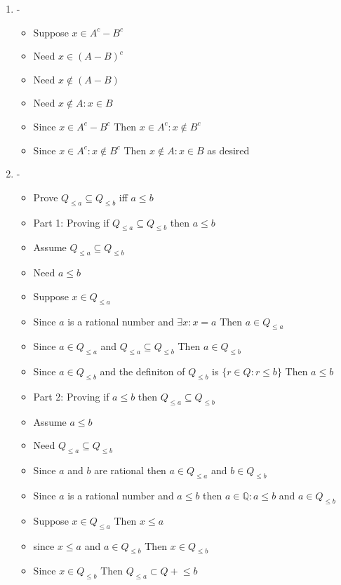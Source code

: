 \documentclass{article}
\begin{document}
\begin{enumerate}
    \item -
    \begin{itemize}
        \item Suppose $x \in A^c - B^c $
        \item Need $x \in (A-B)^c $ 
        \item Need $x \notin (A-B) $
        \item Need $x \notin A: x \in B$ 
        \item Since $x \in A^c - B^c $ Then $x \in A^c : x \notin B^c$
        \item Since $x \in A^c : x \notin B^c$ Then $x \notin A : x \in B$ as desired 
    \end{itemize}
    \item - 
    \begin{itemize}
        \item Prove $Q_{\leq a} \subseteq Q_{\leq b}$ iff $a \leq b $ 
        \item Part 1: Proving if $Q_{\leq a} \subseteq Q_{\leq b}$ then $a \leq b $ 
        \item Assume $Q_{\leq a} \subseteq Q_{\leq b}$
        \item Need $a \leq b $ 
        \item Suppose $ x \in Q_{\leq a}$ 
        \item Since $a$ is a rational number and $\exists x : x = a $ Then $ a \in Q_{\leq a} $ 
        \item Since $ a \in Q_{\leq a} $ and  $ Q_{\leq a} \subseteq Q_{\leq b}$ Then $a \in Q_{\leq b}$
        \item Since $a \in Q_{\leq b} $ and the definiton of $Q_{\leq b} $ is $\{ r \in Q: r \leq b \} $ Then $a \leq b $
        \item Part 2: Proving if $a \leq b $ then $Q_{\leq a} \subseteq Q_{\leq b}$
        \item Assume $a \leq b $
        \item Need $Q_{\leq a} \subseteq Q_{\leq b}$
        \item Since $a$ and $b$ are rational then $a \in Q_{\leq a} $ and $b \in Q_{\leq b} $
        \item Since $a$ is a rational number and $a \leq b $ then $a \in \mathbb{Q}: a \leq b $ and $a \in Q_{\leq b} $ 
        \item Suppose $x \in Q_{\leq a}$ Then $x \leq a $
        \item since $x \leq a $ and $a \in Q_{\leq b} $ Then $x \in Q_{\leq b} $
        \item Since $x \in Q_{\leq b}$ Then $Q_{\leq a } \subset Q+{\leq b} $ 
    \end{itemize}
\end{enumerate}
\end{document}

